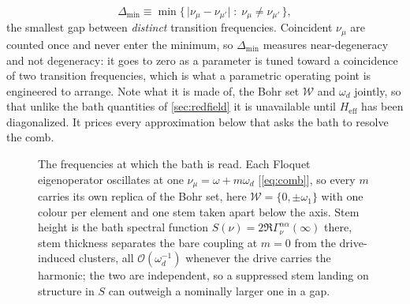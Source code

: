 \documentclass[a4paper,11pt]{article}
\newcommand{\eff}{\mathrm{eff}}
\begin{document}
\begin{equation}\label{eq:deltamin}
  \Delta_{\min} \equiv \min\big\{\,\lvert\nu_\mu - \nu_{\mu'}\rvert \;:\; \nu_\mu\neq\nu_{\mu'}\,\big\},
\end{equation}
the smallest gap between \emph{distinct} transition frequencies. Coincident $\nu_\mu$ are counted once and never enter the minimum, so $\Delta_{\min}$ measures near-degeneracy and not degeneracy: it goes to zero as a parameter is tuned toward a coincidence of two transition frequencies, which is what a parametric operating point is engineered to arrange. Note what it is made of, the Bohr set $\mathcal W$ and $\omega_d$ jointly, so that unlike the bath quantities of \cref{sec:redfield} it is unavailable until $H_\eff$ has been diagonalized. It prices every approximation below that asks the bath to resolve the comb.

\begin{figure}[t]
  \centering
  
  \caption{The frequencies at which the bath is read. Each Floquet eigenoperator oscillates at one $\nu_\mu = \omega + m\omega_d$ [\cref{eq:comb}], so every $m$ carries its own replica of the Bohr set, here $\mathcal W = \{0,\pm\omega_1\}$ with one colour per element and one stem taken apart below the axis. Stem height is the bath spectral function $S(\nu) = 2\Re\Gamma^{\alpha\alpha}_\nu(\infty)$ there, stem thickness separates the bare coupling at $m=0$ from the drive-induced clusters, all $\mathcal O(\omega_d^{-1})$ whenever the drive carries the harmonic; the two are independent, so a suppressed stem landing on structure in $S$ can outweigh a nominally larger one in a gap.}
  \label{fig:comb}
\end{figure}
\end{document}
